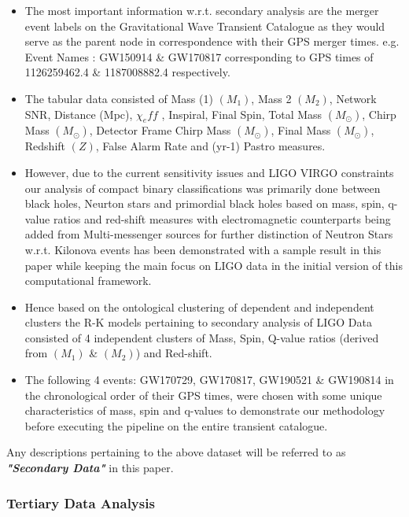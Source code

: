     \begin{itemize}
        \item The most important information w.r.t. secondary analysis are the merger event labels on the Gravitational Wave Transient Catalogue as they would serve as the parent node in correspondence with their GPS merger times. \cite{00_LIGOOpenSciData} \cite{00.2_schutz2012GWDataAnalysis} e.g. Event Names : GW150914 \& GW170817 corresponding to GPS times of 1126259462.4 \&  1187008882.4 respectively.
        \item The tabular data consisted of Mass (1) $(M_1)$, Mass 2 $(M_2)$, Network SNR, Distance (Mpc), $\chi_eff $ , Inspiral, Final Spin, Total Mass $(M_\odot)$, Chirp Mass $(M_\odot)$, Detector Frame Chirp Mass $(M_\odot)$, Final Mass $(M_\odot)$, Redshift $(Z)$, False Alarm Rate and (yr-1) Pastro  measures.
        \item However, due to the current sensitivity issues and LIGO VIRGO constraints \cite{24.8_PBHdetectionparameters} our analysis of compact binary classifications was primarily done between black holes, Neurton stars and primordial black holes based on mass, spin, q-value ratios and red-shift measures with electromagnetic counterparts being added from Multi-messenger sources for further distinction of Neutron Stars w.r.t. Kilonova events has been demonstrated with a sample result in this paper while keeping the main focus on LIGO data in the initial version of this computational framework.
        \item Hence based on the ontological clustering of dependent and independent clusters the R-K models pertaining to secondary analysis of LIGO Data consisted of 4 independent clusters of Mass, Spin, Q-value ratios (derived from $(M_1)$ \& $(M_2)$)  and Red-shift.
        \item The following 4 events: GW170729, GW170817, GW190521 \& GW190814 in the chronological order of their GPS times, were chosen with some unique characteristics of mass, spin and q-values to demonstrate our methodology before executing the pipeline on the entire transient catalogue.

    \end{itemize}

    Any descriptions pertaining to the above dataset will be referred to as \textbf{\textit{"Secondary Data"}} in this paper.

    \subsubsection{Tertiary Data Analysis}
    
